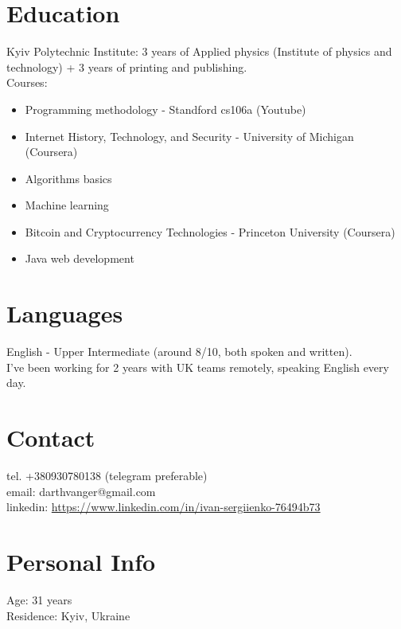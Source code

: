 \documentclass[a4paper, 14pt]{article}
\begin{document}
\section{Education}
  Kyiv Polytechnic Institute: 3 years of Applied physics (Institute of physics and technology) + 3 years of printing and publishing. \\
  Courses:
  \begin{itemize}
    \item Programming methodology - Standford cs106a (Youtube) \\
    \item Internet History, Technology, and Security - University of Michigan (Coursera) \\
    \item Algorithms basics \\
    \item Machine learning \\
    \item Bitcoin and Cryptocurrency Technologies - Princeton University (Coursera) \\
    \item Java web development
  \end{itemize}

\section{Languages}
	English - Upper Intermediate (around 8/10, both spoken and written). \\
  I've been working for 2 years with UK teams remotely, speaking English every day.

\section{Contact}
	tel. +380930780138 (telegram preferable) \\
	email: darthvanger@gmail.com \\
  linkedin: \url{https://www.linkedin.com/in/ivan-sergiienko-76494b73} \\

\section{Personal Info}
	Age: 31 years \\
  Residence: Kyiv, Ukraine
\end{document}
